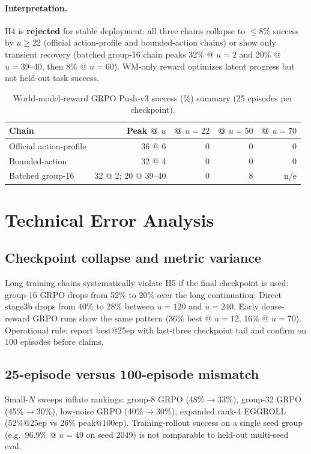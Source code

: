 \paragraph{Interpretation.}
H4 is \textbf{rejected} for stable deployment: all three chains collapse to $\leq 8$\% success by $u{\geq}22$ (official action-profile and bounded-action chains) or show only transient recovery (batched group-16 chain peaks 32\% @ $u{=}2$ and 20\% @ $u{=}39$--40, then 8\% @ $u{=}60$). WM-only reward optimizes latent progress but not held-out task success.

\begin{table}[H]
\centering
\caption{World-model-reward GRPO Push-v3 success (\%) summary (25 episodes per checkpoint).}
\label{tab:wm-reward-summary}
\small
\begin{tabular}{@{}lrrrr@{}}
\toprule
Chain & Peak @ $u$ & @ $u{=}22$ & @ $u{=}50$ & @ $u{=}70$ \\
\midrule
Official action-profile & 36 @ 6 & 0 & 0 & 0 \\
Bounded-action & 32 @ 4 & 0 & 0 & 0 \\
Batched group-16 & 32 @ 2; 20 @ 39--40 & 0 & 8 & n/e \\
\bottomrule
\end{tabular}
\end{table}

\FloatBarrier
\section{Technical Error Analysis}
\label{sec:error-analysis}

\subsection{Checkpoint collapse and metric variance}
Long training chains systematically violate H5 if the final checkpoint is used: group-16 GRPO drops from 52\% to 20\% over the long continuation; Direct stage3b drops from 40\% to 28\% between $u{=}120$ and $u{=}240$. Early dense-reward GRPO runs show the same pattern (36\% best @ $u{=}12$, 16\% @ $u{=}70$). Operational rule: report best@25ep with last-three checkpoint tail and confirm on 100 episodes before claims.

\subsection{25-episode versus 100-episode mismatch}
Small-$N$ sweeps inflate rankings: group-8 GRPO (48\%$\rightarrow$33\%), group-32 GRPO (45\%$\rightarrow$30\%), low-noise GRPO (40\%$\rightarrow$30\%); expanded rank-4 EGGROLL (52\%@25ep vs 26\% peak@100ep). Training-rollout success on a single seed group (e.g.\ 96.9\% @ $u{=}49$ on seed $2049$) is not comparable to held-out multi-seed eval.

